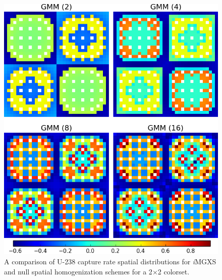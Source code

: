 \begin{figure}[h!]
\centering
\includegraphics[width=0.9\linewidth]{figures/results/compare/2x2/compare-capt}
\vspace{2mm}
\caption[U-238 capture rate comparison for a 2$\times$2 colorset]{A comparison of U-238 capture rate spatial distributions for \textit{i}\ac{MGXS} and null spatial homogenization schemes for a 2$\times$2 colorset.}
\label{fig:chap11-assm-2x2-capt-rates-comp}
\end{figure}

\clearpage


